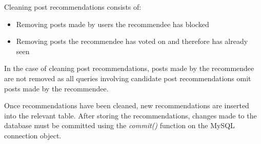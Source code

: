 \noindent Cleaning post recommendations consists of:
\begin{itemize}
\item Removing posts made by users the recommendee has blocked
\item Removing posts the recommendee has voted on and therefore has already seen
\end{itemize}

In the case of cleaning post recommendations, posts made by the recommendee are not removed as all queries involving candidate post recommendations omit posts made by the recommendee.

Once recommendations have been cleaned, new recommendations are inserted into the relevant table. After storing the recommendations, changes made to the database must be committed using the \textit{commit()} function on the MySQL connection object.